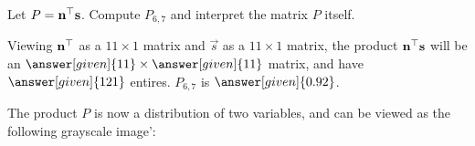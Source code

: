 \documentclass{ximera}
\begin{document}
\begin{example}[Distributions]
\begin{center}
  \end{center}
  Let $P = \mathbf{n}^\top\mathbf{s}$. Compute $P_{6,7}$ and interpret
  the matrix $P$ itself.
  \begin{explanation}
    Viewing $\mathbf{n}^\top$ as a $11\times 1$ matrix and
    $\vec{s}$ as a $11\times 1$ matrix, the product
    $\mathbf{n}^\top\mathbf{s}$ will be an $\answer[given]{11}\times\answer[given]{11}$
    matrix, and have $\answer[given]{121}$ entires. $P_{6,7}$ is
    $\answer[given]{0.92}$.

    The product $P$ is now a distribution of two variables, and can be
    viewed as the following grayscale image':
    \begin{center}
      \newcommand{\matrixData}{{
          {0,0,0.01,0.03,0.07,0.11,0.13,0.1,0.06,0.03,0.01},
          {0,0,0.02,0.06,0.13,0.22,0.25,0.21,0.13,0.06,0.02},
          {0,0,0.03,0.1,0.24,0.39,0.45,0.37,0.22,0.1,0.04},
          {0,0.01,0.04,0.15,0.35,0.58,0.67,0.55,0.33,0.15,0.05},
          {0,0.01,0.05,0.19,0.45,0.74,0.85,0.7,0.42,0.19,0.07},
          {0,0.01,0.06,0.21,0.49,0.8,0.92,0.76,0.46,0.21,0.07},
          {0,0.01,0.05,0.19,0.45,0.74,0.85,0.7,0.42,0.19,0.07},
          {0,0.01,0.04,0.15,0.35,0.58,0.67,0.55,0.33,0.15,0.05},
          {0,0,0.03,0.1,0.24,0.39,0.45,0.37,0.22,0.1,0.04},
          {0,0,0.02,0.06,0.13,0.22,0.25,0.21,0.13,0.06,0.02},
          {0,0,0.01,0.03,0.07,0.11,0.13,0.1,0.06,0.03,0.01}
      }}
      \newcommand{\skewData}{{
           {0., 0.01, 0.07, 0.26, 0.61, 1., 1.15, 0.95, 0.57, 0.26, 0.09}
      }}
      \newcommand{\normData}{{
          {0.11, 0.22, 0.39, 0.58, 0.74, 0.8, 0.74, 0.58, 0.39, 0.22, 0.11}
      }}
\end{center}
\end{explanation}
\end{example}
\end{document}

